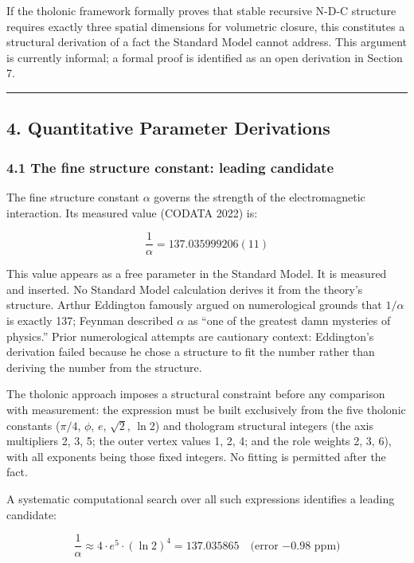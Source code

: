 \documentclass[
  11pt,
  letterpaper,
]{article}
\begin{document}
If the tholonic framework formally proves that stable recursive N-D-C
structure requires exactly three spatial dimensions for volumetric
closure, this constitutes a structural derivation of a fact the Standard
Model cannot address. This argument is currently informal; a formal
proof is identified as an open derivation in Section 7.

\begin{center}\rule{0.5\linewidth}{0.5pt}\end{center}

\subsection{4. Quantitative Parameter
Derivations}\label{quantitative-parameter-derivations}

\subsubsection{4.1 The fine structure constant: leading
candidate}\label{the-fine-structure-constant-leading-candidate}

The fine structure constant \(\alpha\) governs the strength of the
electromagnetic interaction. Its measured value (CODATA 2022) is:

\[\frac{1}{\alpha} = 137.035999206(11)\]

This value appears as a free parameter in the Standard Model. It is
measured and inserted. No Standard Model calculation derives it from the
theory's structure. Arthur Eddington famously argued on numerological
grounds that \(1/\alpha\) is exactly 137; Feynman described \(\alpha\)
as ``one of the greatest damn mysteries of physics.'' Prior
numerological attempts are cautionary context: Eddington's derivation
failed because he chose a structure to fit the number rather than
deriving the number from the structure.

The tholonic approach imposes a structural constraint before any
comparison with measurement: the expression must be built exclusively
from the five tholonic constants (\(\pi/4\), \(\phi\), \(e\),
\(\sqrt{2}\), \(\ln 2\)) and thologram structural integers (the axis
multipliers 2, 3, 5; the outer vertex values 1, 2, 4; and the role
weights 2, 3, 6), with all exponents being those fixed integers. No
fitting is permitted after the fact.

A systematic computational search over all such expressions identifies a
leading candidate:

\[\frac{1}{\alpha} \approx 4 \cdot e^5 \cdot (\ln 2)^4 = 137.035865 \quad \text{(error } {-0.98 \text{ ppm)}}\]
\end{document}

